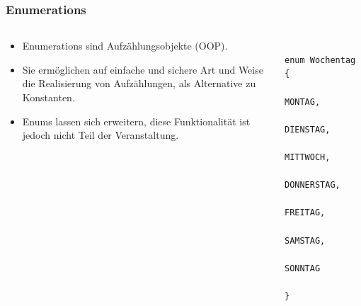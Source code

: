 \begin{frame}[fragile]
	\frametitle{Enumerations}
	\begin{columns}
		 \begin{column}{0.5\textwidth}
			  \small
				\begin{itemize}
				  \item Enumerations sind Aufzählungsobjekte (OOP).
				  \item Sie ermöglichen auf einfache und sichere Art und Weise
				 die Realisierung von Aufzählungen, als Alternative zu Konstanten.
				 \item Enums lassen sich erweitern, diese Funktionalität ist jedoch nicht
				 Teil der Veranstaltung.
				\end{itemize}
	 \end{column}
		 \begin{column}{0.5\textwidth}
		 	\begin{lstlisting}
		 		enum Wochentag {
		 			MONTAG, 
		 			DIENSTAG, 
		 			MITTWOCH, 
		 			DONNERSTAG, 
		 			FREITAG, 
		 			SAMSTAG,
		 			SONNTAG
		 		}
		 	\end{lstlisting}
		 \end{column}
	 \end{columns}
\end{frame}